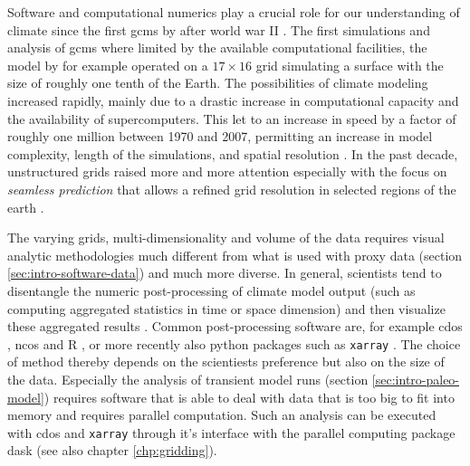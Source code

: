 \begin{refsection}
Software and computational numerics play a crucial role for our understanding of climate since the first \glspl{gcm} by \cite{Phillips1956} after world war II \citep{Edwards2010, Lewis1998}. The first simulations and analysis of \glspl{gcm} where limited by the available computational facilities, the model by \cite{Phillips1956} for example operated on a $17 \times 16$ grid simulating a surface with the size of roughly one tenth of the Earth. The possibilities of climate modeling increased rapidly, mainly due to a drastic increase in computational capacity and the availability of supercomputers. This let to an increase in speed by a factor of roughly one million between 1970 and 2007, permitting an increase in model complexity, length of the simulations, and spatial resolution \citep{TreutSomervilleCubaschEtAl2007}. In the past decade, unstructured grids raised more and more attention \citep{ZaenglReinertRipodasEtAl2014, SkamarockKlempDudaEtAl2012} especially with the focus on \textit{seamless prediction} \citep{Hoskins2012, BauerThorpeBrunet2015} that allows a refined grid resolution in selected regions of the earth \citep{RautenhausBoettingerSiemenEtAl2018}.

The varying grids, multi-dimensionality and volume of the data requires visual analytic methodologies much different from what is used with proxy data (section \ref{sec:intro-software-data}) and much more diverse. In general, scientists tend to disentangle the numeric post-processing of climate model output (such as computing aggregated statistics in time or space dimension) and then visualize these aggregated results \citep{BoettingerRoeber2019, SchulzNockeHeitzlerEtAl2013}. Common post-processing software are, for example \glspl{cdo} \citep{Schulzweida2019}, \glspl{nco} \citep{Zender2008, ZenderMangalam2007, Zender2016} and R \citep{RCT2019}, or more recently also python packages such as \texttt{xarray} \citep{HoyerHamman2017}. The choice of method thereby depends on the scientiests preference but also on the size of the data. Especially the analysis of transient model runs (section \ref{sec:intro-paleo-model}) requires software that is able to deal with data that is too big to fit into memory and requires parallel computation. Such an analysis can be executed with \glspl{cdo} and \texttt{xarray} through it's interface with the parallel computing package dask \citep{DDT2016, Rocklin2015} (see also chapter \ref{chp:gridding}).


\end{refsection}
